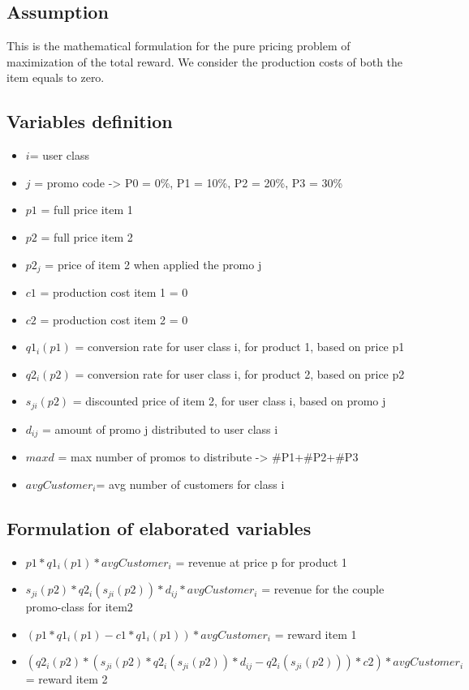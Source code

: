 \subsection{Assumption}
This is the mathematical formulation for the pure pricing problem of maximization of the total reward. We consider the production costs of both the item equals to zero.

\subsection{Variables definition}
\begin{itemize}
\item $i$= user class 
\item $j$ = promo code -> P0 = 0\%, P1 = 10\%, P2 = 20\%, P3 = 30\%
\item $p1$ = full price item 1
\item $p2$ = full price item 2
\item $p2_j$ = price of item 2 when applied the promo j
\item $c1$ = production cost item 1 = 0
\item $c2$ = production cost item 2 = 0
\item $q1_i(p1)$ = conversion rate for user class i, for product 1, based on price p1
\item $q2_i(p2)$ = conversion rate for user class i, for product 2, based on price p2
\item $s_{ji}(p2)$ = discounted price of item 2, for user class i, based on promo j
\item $d_{ij}$ = amount of promo j distributed to user class i
\item $maxd$ = max number of promos to distribute -> \#P1+\#P2+\#P3
\item $avgCustomer_i$= avg number of customers for class i
\end{itemize}


\subsection{Formulation of elaborated variables}
\begin{itemize}
\item $p1*q1_i(p1)*avgCustomer_i$ = revenue at price p for product 1 
\item $s_{ji}(p2)*q2_i(s_{ji}(p2))*d_{ij}*avgCustomer_i$ = revenue for the couple promo-class for item2
\item $(p1*q1_i(p1)-c1*q1_i(p1))*avgCustomer_i$ = reward item 1 
\item $(q2_i(p2)*(s_{ji}(p2)*q2_i(s_{ji}(p2))*d_{ij}-q2_i(s_{ji}(p2)))*c2)*avgCustomer_i$ = reward item 2
\end{itemize}

